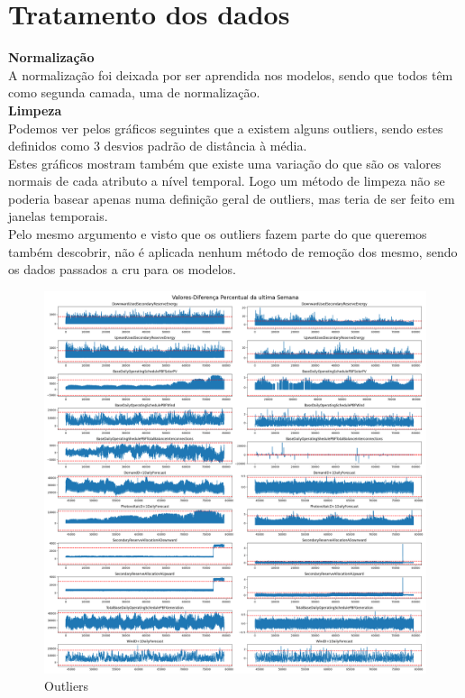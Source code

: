


\section{Tratamento dos dados}

\textbf{Normalização} \\
A normalização foi deixada por ser aprendida nos modelos, sendo que todos têm como segunda camada, uma de normalização. \\

\textbf{Limpeza} \\

Podemos ver pelos gráficos seguintes que a existem alguns outliers, sendo estes definidos como 3 desvios padrão de distância à média. \\
Estes gráficos mostram também que existe uma variação do que são os valores normais de cada atributo a nível temporal. Logo um método de limpeza não se poderia basear apenas numa definição geral de outliers, mas teria de ser feito em janelas temporais. \\
Pelo mesmo argumento e visto que os outliers fazem parte do que queremos também descobrir, não é aplicada nenhum método de remoção dos mesmo, sendo os dados passados a cru para os modelos. \\


\begin{figure}[H]
  \centering
  \includegraphics[width=\textwidth]{plots/Outliers_3stds.png}
  \caption{Outliers}
\end{figure}

